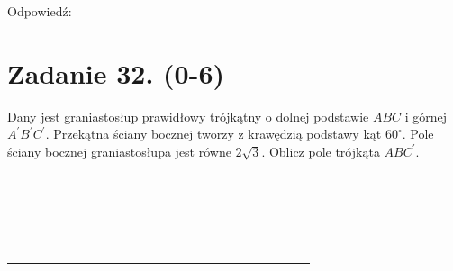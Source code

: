 \documentclass[10pt]{article}
\begin{document}
Odpowiedź:

\section*{Zadanie 32. (0-6)}
Dany jest graniastosłup prawidłowy trójkątny o dolnej podstawie \(A B C\) i górnej \(A^{\prime} B^{\prime} C^{\prime}\). Przekątna ściany bocznej tworzy z krawędzią podstawy kąt \(60^{\circ}\). Pole ściany bocznej graniastosłupa jest równe \(2 \sqrt{3}\). Oblicz pole trójkąta \(A B C^{\prime}\).

\begin{center}
\begin{tabular}{|c|c|c|c|c|c|c|c|c|c|c|c|c|c|c|c|c|c|c|c|c|}
\hline
 &  &  &  &  &  &  &  &  &  &  &  &  &  &  &  &  &  &  &  &  \\
\hline
 &  &  &  &  &  &  &  &  &  &  &  &  &  &  &  &  &  &  &  &  \\
\hline
 &  &  &  &  &  &  &  &  &  &  &  &  &  &  &  &  &  &  &  &  \\
\hline
 &  &  &  &  &  &  &  &  &  &  &  &  &  &  &  &  &  &  &  &  \\
\hline
 &  &  &  &  &  &  &  &  &  &  &  &  &  &  &  &  &  &  &  &  \\
\hline
 &  &  &  &  &  &  &  &  &  &  &  &  &  &  &  &  &  &  &  &  \\
\hline
 &  &  &  &  &  &  &  &  &  &  &  &  &  &  &  &  &  &  &  &  \\
\hline
 &  &  &  &  &  &  &  &  &  &  &  &  &  &  &  &  &  &  &  &  \\
\hline
 &  &  &  &  &  &  &  &  &  &  &  &  &  &  &  &  &  &  &  &  \\
\hline
 &  &  &  &  &  &  &  &  &  &  &  &  &  &  &  &  &  &  &  &  \\
\hline
 &  &  &  &  &  &  &  &  &  &  &  &  &  &  &  &  &  &  &  &  \\
\hline
 &  &  &  &  &  &  &  &  &  &  &  &  &  &  &  &  &  &  &  &  \\
\hline
 &  &  &  &  &  &  &  &  &  &  &  &  &  &  &  &  &  &  &  &  \\
\hline
 &  &  &  &  &  &  &  &  &  &  &  &  &  &  &  &  &  &  &  &  \\
\hline
 &  &  &  &  &  &  &  &  &  &  &  &  &  &  &  &  &  &  &  &  \\
\hline
 &  &  &  &  &  &  &  &  &  &  &  &  &  &  &  &  &  &  &  &  \\
\hline
 &  &  &  &  &  &  &  &  &  &  &  &  &  &  &  &  &  &  &  &  \\

\end{tabular}
\end{center}
\end{document}
